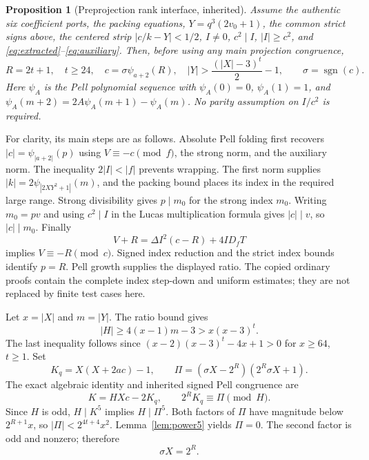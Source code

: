 \documentclass[11pt]{article}
\newcommand{\sgn}{\operatorname{sgn}}
\newtheorem{proposition}[theorem]{Proposition}
\theoremstyle{definition}
\theoremstyle{remark}
\begin{document}
\begin{proposition}[Preprojection rank interface, inherited]
\label{prop:rank}
Assume the authentic six coefficient ports, the packing equations,
$Y=q^3(2v_0+1)$, the common strict signs above, the centered strip
$|c/k-Y|<1/2$, $I\ne0$, $c^2\mid I$, $|I|\ge c^2$, and
\eqref{eq:extracted}--\eqref{eq:auxiliary}. Then, before using any
main projection congruence,
\[
 R=2t+1,\quad t\ge24,\quad
 c=\sigma\psi_{a+2}(R),\quad
 |Y|>\frac{(|X|-3)^t}{2}-1,
 \qquad\sigma=\sgn(c).
\]
Here $\psi_A$ is the Pell polynomial sequence with
$\psi_A(0)=0$, $\psi_A(1)=1$, and
$\psi_A(m+2)=2A\psi_A(m+1)-\psi_A(m)$.
No parity assumption on $I/c^2$ is required.
\end{proposition}

For clarity, its main steps are as follows. Absolute Pell folding first
recovers $|c|=\psi_{|a+2|}(p)$ using
$V\equiv-c\pmod f$, the strong norm, and the auxiliary norm.
The inequality $2|I|<|f|$ prevents wrapping. The first norm supplies
$|k|=2\psi_{|2XY^2+1|}(m)$, and the packing bound places its index
in the required large range. Strong divisibility gives $p\mid m_0$
for the strong index $m_0$. Writing $m_0=pv$ and using
$c^2\mid I$ in the Lucas multiplication formula gives $|c|\mid v$,
so $|c|\mid m_0$. Finally
\[
 V+R=\Delta I^2(c-R)+4ID_fT
\]
implies $V\equiv-R\pmod c$. Signed index reduction and the strict
index bounds identify $p=R$. Pell growth supplies the displayed ratio.
The copied ordinary proofs contain the complete index step-down and
uniform estimates; they are not replaced by finite test cases here.

Let $x=|X|$ and $m=|Y|$. The ratio bound gives
\[
 |H|\ge4(x-1)m-3>x(x-3)^t.
\]
The last inequality follows since
$(x-2)(x-3)^t-4x+1>0$ for $x\ge64$, $t\ge1$.
Set
\begin{equation}\label{eq:projector}
 K_q=X(X+2ac)-1,\qquad
 \Pi=(\sigma X-2^R)(2^R\sigma X+1).
\end{equation}
The exact algebraic identity and inherited signed Pell congruence are
\begin{equation}\label{eq:congruences}
 K=HXc-2K_q,\qquad 2^RK_q\equiv\Pi\pmod H.
\end{equation}
Since $H$ is odd, $H\mid K^5$ implies $H\mid\Pi^5$.
Both factors of $\Pi$ have magnitude below $2^{R+1}x$, so
$|\Pi|<2^{4t+4}x^2$. Lemma~\ref{lem:power5} yields $\Pi=0$.
The second factor is odd and nonzero; therefore
\begin{equation}\label{eq:powerrecovered}
 \sigma X=2^R.
\end{equation}
\end{document}
